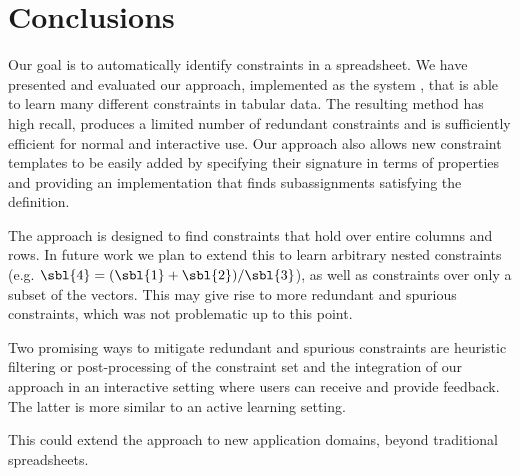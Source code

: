\section{Conclusions}\label{sec:tacle_conclusions}

Our goal is to automatically identify constraints in a spreadsheet.
We have presented and evaluated our approach, implemented as the system \sname, that is able to learn many different constraints in tabular data.
The resulting method has high recall, produces a limited number of redundant constraints and is sufficiently efficient for normal and interactive use.
Our approach also allows new constraint templates to be easily added by specifying their signature in terms of properties and providing an implementation that finds subassignments satisfying the definition.

The approach is designed to find constraints that hold over entire columns and rows. In future work we plan to extend this to learn arbitrary nested constraints (e.g. $\sbl{4} = (\sbl{1} + \sbl{2}) / \sbl{3}$), as well as constraints over only a subset of the vectors. This may give rise to more redundant and spurious constraints, which was not problematic up to this point.

Two promising ways to mitigate redundant and spurious constraints are heuristic filtering or post-processing of the constraint set and the integration of our approach in an interactive setting where users can receive and provide feedback.
The latter is more similar to an active learning setting.

This could extend the approach to new application domains, beyond traditional spreadsheets.

